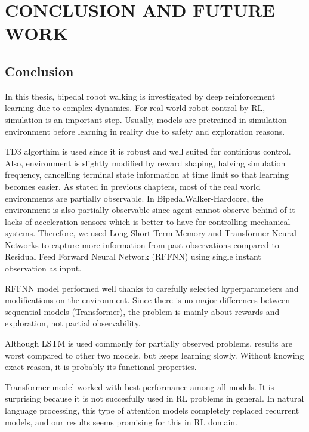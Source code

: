 \chapter{CONCLUSION AND FUTURE WORK}
\label{chap:conclusion_future_work}

\section{Conclusion}
\label{sec:conclusion}
In this thesis, bipedal robot walking is investigated by deep  reinforcement learning due to complex dynamics. 
For real world robot control by RL, simulation is an important step. 
Usually, models are pretrained in simulation environment before learning in reality due to safety and exploration reasons. 

TD3 algorthim is used since it is robust and well suited for continious control. 
Also, environment is slightly modified by reward shaping, halving simulation frequency, cancelling terminal state information at time limit so that learning becomes easier.  
As stated in previous chapters, most of the real world environments are partially observable. 
In BipedalWalker-Hardcore, the environment is also partially observable since agent cannot observe behind of it lacks of acceleration sensors which is better to have for controlling mechanical systems. 
Therefore, we used Long Short Term Memory and Transformer Neural Networks to capture more information from past observations compared to Residual Feed Forward Neural Network (RFFNN) using single instant observation as input. 

RFFNN model performed well thanks to carefully selected hyperparameters and modifications on the environment. 
Since there is no major differences between sequential models (Transformer), the problem is mainly about rewards and exploration, not partial observability. 

Although LSTM is used commonly for partially observed problems, results are worst compared to other two models, but keeps learning slowly. 
Without knowing exact reason, it is probably its functional properties. 

Transformer model worked with best performance among all models. 
It is surprising because it is not succesfully used in RL problems in general. 
In natural language processing, this type of attention models completely replaced recurrent models, and our results seems promising for this in RL domain. 


